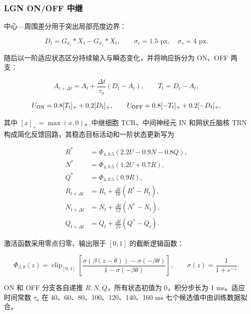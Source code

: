 \subsubsection{LGN ON/OFF 中继}

中心—周围差分用于突出局部亮度边界：

\begin{equation}
D_t=G_{\sigma_c}*X_t-G_{\sigma_s}*X_t,\qquad \sigma_c=1.5\text{ px},\quad \sigma_s=4\text{ px}.
\end{equation}

随后以一阶适应状态区分持续输入与瞬态变化，并将响应拆分为 ON、OFF 两支：

\begin{equation}
A_{t+\Delta t}=A_t+\frac{\Delta t}{\tau_a}(D_t-A_t),\qquad T_t=D_t-A_t,
\end{equation}

\begin{equation}
U_{\rm ON}=0.8[T_t]_++0.2[D_t]_+,\qquad
U_{\rm OFF}=0.8[-T_t]_++0.2[-D_t]_+,
\end{equation}

其中 \([x]_+=\max(x,0)\)。中继细胞 TCR、中间神经元 IN 和网状丘脑核 TRN 构成简化反馈回路，其稳态目标活动和一阶状态更新写为

\begin{equation}
\begin{aligned}
R^*&=\Phi_{4,0.5}(2.2U-0.9N-0.8Q),\\
N^*&=\Phi_{4,0.5}(1.2U+0.7R),\\
Q^*&=\Phi_{4,0.5}(0.9R),\\
R_{t+\Delta t}&=R_t+\frac{\Delta t}{18}(R^*-R_t),\\
N_{t+\Delta t}&=N_t+\frac{\Delta t}{12}(N^*-N_t),\\
Q_{t+\Delta t}&=Q_t+\frac{\Delta t}{25}(Q^*-Q_t).
\end{aligned}
\end{equation}

激活函数采用零点归零、输出限于 \([0,1]\) 的截断逻辑函数：

\begin{equation}
\Phi_{\beta,\theta}(z)=\operatorname{clip}_{[0,1]}\!\left[
\frac{\sigma(\beta(z-\theta))-\sigma(-\beta\theta)}
{1-\sigma(-\beta\theta)}\right],\qquad \sigma(z)=\frac{1}{1+e^{-z}}.
\end{equation}

ON 和 OFF 分支各自递推 \(R,N,Q\)，所有状态初值为 0，积分步长为 1 ms。适应时间常数 \(\tau_a\) 在 40、60、80、100、120、140、160 ms 七个候选值中由训练数据拟合。

